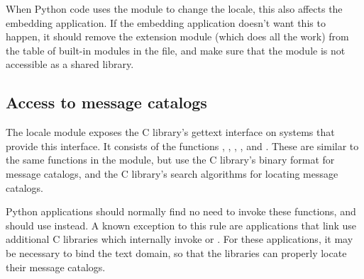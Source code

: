 When Python code uses the  module to change the locale,
this also affects the embedding application.  If the embedding
application doesn't want this to happen, it should remove the
 extension module (which does all the work) from the
table of built-in modules in the  file, and make sure
that the  module is not accessible as a shared library.


\subsection{Access to message catalogs \label{locale-gettext}}

The locale module exposes the C library's gettext interface on systems
that provide this interface.  It consists of the functions
, , ,
, and .  These are
similar to the same functions in the  module, but use
the C library's binary format for message catalogs, and the C
library's search algorithms for locating message catalogs. 

Python applications should normally find no need to invoke these
functions, and should use  instead.  A known
exception to this rule are applications that link use additional C
libraries which internally invoke  or
.  For these applications, it may be necessary to
bind the text domain, so that the libraries can properly locate their
message catalogs.
